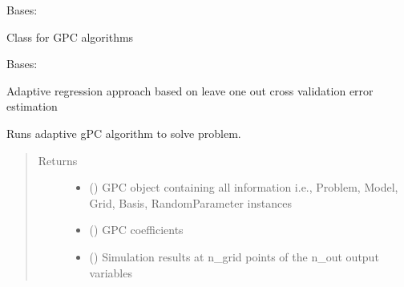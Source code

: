 \documentclass[letterpaper,10pt,english,openany,oneside]{sphinxmanual}
\begin{document}
\begin{fulllineitems}
\label{\detokenize{pygpc:pygpc.Algorithm.Algorithm}}
Bases: 

Class for GPC algorithms

\end{fulllineitems}


\begin{fulllineitems}
\label{\detokenize{pygpc:pygpc.Algorithm.RegAdaptive}}
Bases: {\hyperref[\detokenize{pygpc:pygpc.Algorithm.Algorithm}]{}}

Adaptive regression approach based on leave one out cross validation error estimation

\begin{fulllineitems}
\label{\detokenize{pygpc:pygpc.Algorithm.RegAdaptive.run}}
Runs adaptive gPC algorithm to solve problem.
\begin{quote}\begin{description}
\item[{Returns}] \leavevmode
\begin{itemize}
\item {} 
 () \textendash{} GPC object containing all information i.e., Problem, Model, Grid, Basis, RandomParameter instances

\item {} 
 () \textendash{} GPC coefficients

\item {} 
 () \textendash{} Simulation results at n\_grid points of the n\_out output variables

\end{itemize}


\end{description}\end{quote}

\end{fulllineitems}


\end{fulllineitems}
\end{document}
